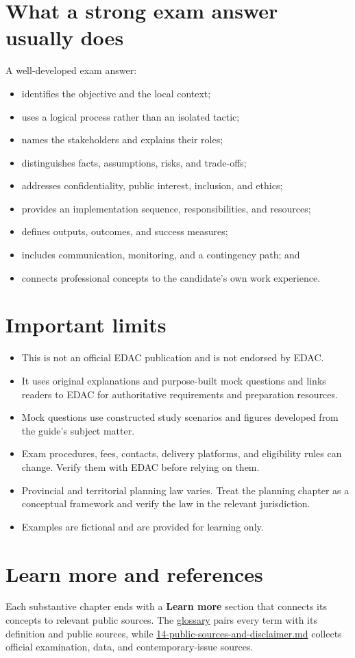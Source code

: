\documentclass[11pt,letterpaper,oneside,openany]{book}
\newif\ifsectionhasicon
\newcommand{\currentsectionicon}{}
\newcommand{\marginsection}[2]{%
  \begingroup
  \sectionhasicontrue
  \def\currentsectionicon{#1}%
  \section[#2]{#2}%
  \endgroup
}
\begin{document}
\marginsection{lightbulb}{What a strong exam answer usually does}
A well-developed exam answer:


\begin{itemize}
\item identifies the objective and the local context;
\item uses a logical process rather than an isolated tactic;
\item names the stakeholders and explains their roles;
\item distinguishes facts, assumptions, risks, and trade-offs;
\item addresses confidentiality, public interest, inclusion, and ethics;
\item provides an implementation sequence, responsibilities, and resources;
\item defines outputs, outcomes, and success measures;
\item includes communication, monitoring, and a contingency path; and
\item connects professional concepts to the candidate's own work experience.
\end{itemize}


\marginsection{triangle-alert}{Important limits}
\begin{itemize}
\item This is not an official EDAC publication and is not endorsed by EDAC.
\item It uses original explanations and purpose-built mock questions and links readers to EDAC for authoritative requirements and preparation resources.
\item Mock questions use constructed study scenarios and figures developed from the guide's subject matter.
\item Exam procedures, fees, contacts, delivery platforms, and eligibility rules can change. Verify them with EDAC before relying on them.
\item Provincial and territorial planning law varies. Treat the planning chapter as a conceptual framework and verify the law in the relevant jurisdiction.
\item Examples are fictional and are provided for learning only.
\end{itemize}


\marginsection{external-link}{Learn more and references}
Each substantive chapter ends with a \textbf{Learn more} section that connects its concepts to relevant public sources. The \hyperref[chap:glossary]{glossary} pairs every term with its definition and public sources, while \hyperref[chap:sources]{14-public-sources-and-disclaimer.md} collects official examination, data, and contemporary-issue sources.
\end{document}
